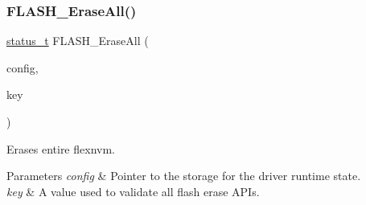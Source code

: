 \subsubsection{\texorpdfstring{FLASH\_EraseAll()}{FLASH\_EraseAll()}}
{\footnotesize\ttfamily \mbox{\hyperlink{group__ksdk__common_gaaabdaf7ee58ca7269bd4bf24efcde092}{status\+\_\+t}} F\+L\+A\+S\+H\+\_\+\+Erase\+All (\begin{DoxyParamCaption}\item[{\mbox{\hyperlink{group__ftfx__flash__driver_ga0dfc969e6f9e17c17e60d823565141a5}{flash\+\_\+config\+\_\+t}} $\ast$}]{config,  }\item[{uint32\+\_\+t}]{key }\end{DoxyParamCaption})}



Erases entire flexnvm. 


\begin{DoxyParams}{Parameters}
{\em config} & Pointer to the storage for the driver runtime state. \\
\hline
{\em key} & A value used to validate all flash erase A\+P\+Is.\\
\hline
\end{DoxyParams}

